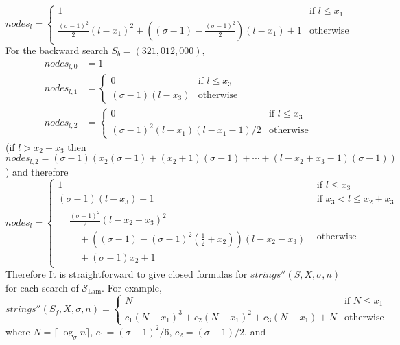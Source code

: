 \documentclass[12pt]{article}
\newcommand{\schemelam}{\mathcal{S}_{\text{Lam}}}
\newcommand{\partition}{X}
\newcommand{\numstrings}{\mathit{strings}}
\newcommand{\numnodes}[1]{\mathit{nodes}_{#1}}
\newcommand{\numnodesd}[2]{\mathit{nodes}_{#1,#2}}
\newcommand{\numstringspp}{\numstrings''}
\newcommand{\logn}{N}
\begin{document}
\begin{equation}\label{eq:nl}
\numnodes{l} = \begin{cases}
1
 & \text{if }l \leq x_1\\
\frac{(\sigma-1)^2}{2}(l-x_1)^2+
 \left((\sigma-1)-\frac{(\sigma-1)^2}{2}\right)(l-x_1)+1
 & \text{otherwise}
\end{cases}
\end{equation}
For the backward search $S_b = (321,012,000)$,
\begin{align*}
\numnodesd{l}{0} &= 1 \\
\numnodesd{l}{1} &= \begin{cases}
0 & \text{if }l \leq x_3 \\
(\sigma-1)(l-x_3) & \text{otherwise}
\end{cases}\\
\numnodesd{l}{2} &= \begin{cases}
0 & \text{if }l \leq x_3 \\
(\sigma-1)^2 (l-x_1)(l-x_1-1)/2 & \text{otherwise}
\end{cases}
\end{align*}
(if $l > x_2+x_3$ then 
$\numnodesd{l}{2}=(\sigma-1)(x_2(\sigma-1)+(x_2+1)(\sigma-1)+\cdots+(l-x_2+x_3-1)(\sigma-1))$)
and therefore
\begin{equation}\label{eq:nl2}
\numnodes{l} = \begin{cases}
1
 & \text{if }l \leq x_3\\
(\sigma-1)(l-x_3)+1
 & \text{if }x_3 < l \leq x_2+x_3\\
\begin{aligned}
& \frac{(\sigma-1)^2}{2}(l-x_2-x_3)^2\\
& \quad + \left((\sigma-1)-(\sigma-1)^2(\frac{1}{2}+x_2)\right)
  (l-x_2-x_3)\\
& \quad + (\sigma-1)x_2+1
\end{aligned}
 & \text{otherwise}
\end{cases}
\end{equation}
Therefore
\else
It is straightforward to give closed formulas for $\numstringspp(S,\partition,\sigma,n)$ for each search of $\schemelam$.
For example,
\fi
\[
\numstringspp(S_f,\partition,\sigma,n) = \begin{cases}
\logn & \text{if }\logn \leq x_1\\
c_1(\logn-x_1)^3 + c_2(\logn-x_1)^2 + c_3(\logn-x_1) + \logn
& \text{otherwise}
\end{cases}
\]
where
$\logn = \lceil\log_{\sigma} n\rceil$,
$c_1 = (\sigma-1)^2/6$,
$c_2 = (\sigma-1)/2 $, and
\end{document}
